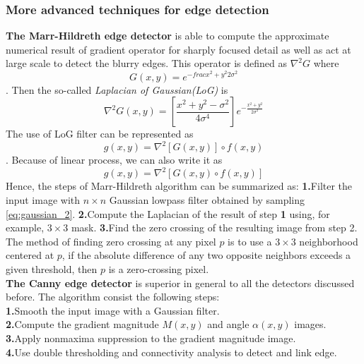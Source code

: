 \subsubsection{More advanced techniques for edge detection}
\textbf{The Marr-Hildreth edge detector} is able to compute the approximate numerical result of gradient operator for sharply focused detail as well as act at large scale to detect the blurry edges. This operator is defined as $\nabla^2 G$ where \begin{equation}G(x,y) = e^{-frac{x^2+y^2}{2\sigma^2}} \label{eq:gaussian_2}\end{equation}. Then the so-called \emph{Laplacian of Gaussian(LoG)} is \begin{equation} \nabla^2 G(x,y) = \left[ \frac{x^2+y^2-\sigma^2}{4\sigma^4} \right]e^{-\frac{x^2+y^2}{2\sigma^2}} \end{equation} The use of LoG filter can be represented as \begin{equation} g(x,y)=\nabla^2\left[G(x,y)\right]\circ f(x,y) \end{equation}. Because of linear process, we can also write it as \begin{equation} g(x,y)=\nabla^2\left[G(x,y)\circ f(x,y)\right] \end{equation} 
Hence, the steps of Marr-Hildreth algorithm can be summarized as: \textbf{1.}Filter the input image with $n\times n$ Gaussian lowpass filter obtained by sampling \ref{eq:gaussian_2}. \textbf{2.}Compute the Laplacian of the result of step \textbf{1} using, for example, $3\times 3$ mask. \textbf{3.}Find the zero crossing of the resulting image from step 2. \\
The method of finding zero crossing at any pixel $p$ is to use a $3\times 3$ neighborhood centered at $p$, if the absolute difference of any two opposite neighbors exceeds a given threshold, then $p$ is a zero-crossing pixel.\\
\textbf{The Canny edge detector} is superior in general to all the detectors discussed before. The algorithm consist the following steps: \\
\textbf{1.}Smooth the input image with a Gaussian filter.\\ 
\textbf{2.}Compute the gradient magnitude $M(x,y)$ and angle $\alpha(x,y)$ images. \\
\textbf{3.}Apply nonmaxima suppression to the gradient magnitude image. \\
\textbf{4.}Use double thresholding and connectivity analysis to detect and link edge. \\

